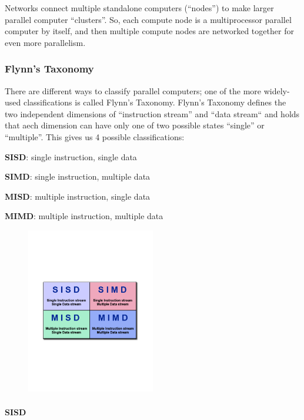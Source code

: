\documentclass[12pt]{article}
\begin{document}
Networks connect multiple standalone computers (``nodes'') to make larger
parallel computer ``clusters''. So, each compute node is a multiprocessor
parallel computer by itself, and then multiple compute nodes are networked
together for even more parallelism.

\subsubsection*{Flynn's Taxonomy}

There are different ways to classify parallel computers; one of the more
widely-used classifications is called Flynn's Taxonomy. Flynn's Taxonomy defines
the two independent dimensions of ``instruction stream'' and ``data stream``
and holds that aech dimension can have only one of two possible states
``single'' or ``multiple''. This gives us 4 possible classifications:

\begin{compactitem}
\item \textbf{SISD}: single instruction, single data
\item \textbf{SIMD}: single instruction, multiple data
\item \textbf{MISD}: multiple instruction, single data
\item \textbf{MIMD}: multiple instruction, multiple data
\end{compactitem}

\begin{figure}[!htb]
\centering
\includegraphics[width=0.5\textwidth]{flynns.pdf}
\end{figure}

\pagebreak
\paragraph*{SISD}
\end{document}
